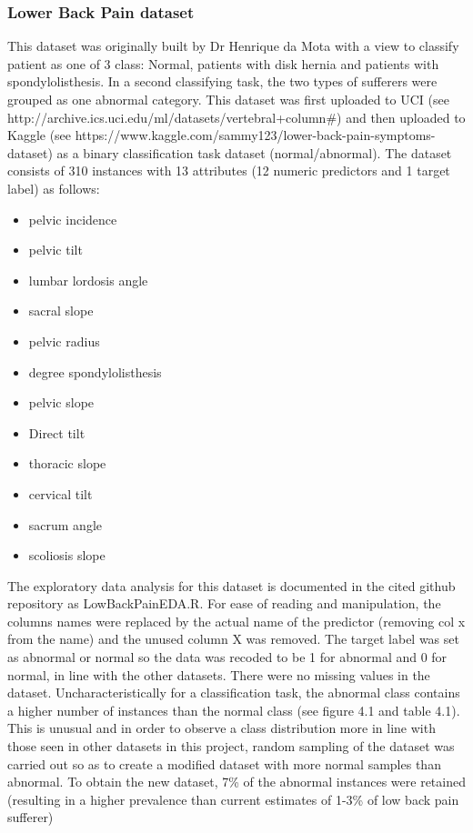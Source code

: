 \subsubsection{Lower Back Pain dataset}
This dataset was originally built by Dr Henrique da Mota with a view to classify patient as one of 3 class: Normal, patients with disk hernia and patients with spondylolisthesis. In a second classifying task, the two types of sufferers were grouped as one abnormal category. This dataset was first uploaded to UCI (see http://archive.ics.uci.edu/ml/datasets/vertebral+column#) and then uploaded to Kaggle (see https://www.kaggle.com/sammy123/lower-back-pain-symptoms-dataset) as a binary classification task dataset (normal/abnormal).\newline
The dataset consists of 310 instances with 13 attributes (12 numeric predictors and 1 target label) as follows:
\begin{itemize}
    \item pelvic incidence
    \item pelvic tilt
    \item lumbar lordosis angle
    \item sacral slope
    \item pelvic radius
    \item degree spondylolisthesis
    \item pelvic slope
    \item Direct tilt
    \item thoracic slope
    \item cervical tilt
    \item sacrum angle
    \item scoliosis slope
\end{itemize}

The exploratory data analysis for this dataset is documented in the cited github repository as LowBackPainEDA.R.\newline
For ease of reading and  manipulation, the columns names were replaced by the actual name of the predictor (removing col x from the name) and the unused column X was removed.\newline
The target label was set as abnormal or normal so the data was recoded to be 1 for abnormal and 0 for normal, in line with the other datasets.
There were no missing values in the dataset.
Uncharacteristically for a classification task, the abnormal class contains a higher number of instances than the normal class (see figure 4.1 and table 4.1). This is unusual and in order to observe a class distribution more in line with those seen in other datasets in this project, random sampling of the dataset was  carried out so as to create a modified dataset with more normal samples than abnormal. To obtain the new dataset, 7\% of the abnormal instances were  retained (resulting in a higher prevalence than current estimates of 1-3\% of low back pain sufferer) %

